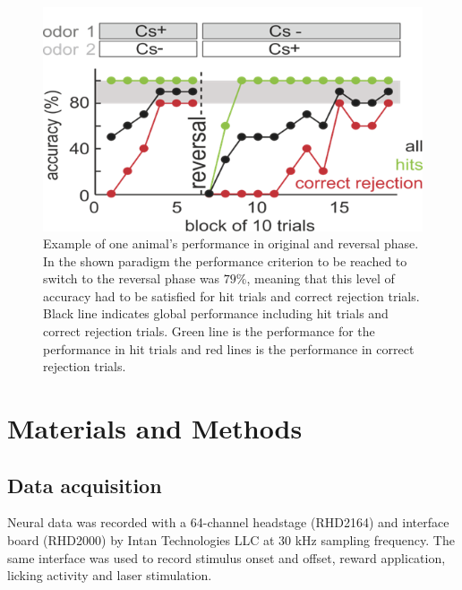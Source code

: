 \begin{figure}
    \centering
\includegraphics[scale=1]{figures/Performance.png}
\caption{Example of one animal's performance in original and reversal phase. In the shown paradigm the performance criterion to be reached to switch to the reversal phase was $79\%$, meaning that this level of accuracy had to be satisfied for hit trials and correct rejection trials. Black line indicates global performance including hit trials and correct rejection trials. Green line is the performance for the performance in hit trials and red lines is the performance in correct rejection trials.}
\label{fig:performance}
\end{figure}
\section{Materials and Methods}
\label{sec:MatAndMet}
\subsection{Data acquisition}Neural data was recorded with a 64-channel headstage (RHD2164) and interface board (RHD2000) by Intan Technologies LLC at 30 kHz sampling frequency. The same interface was used to record stimulus onset and offset, reward application, licking activity and laser stimulation.
